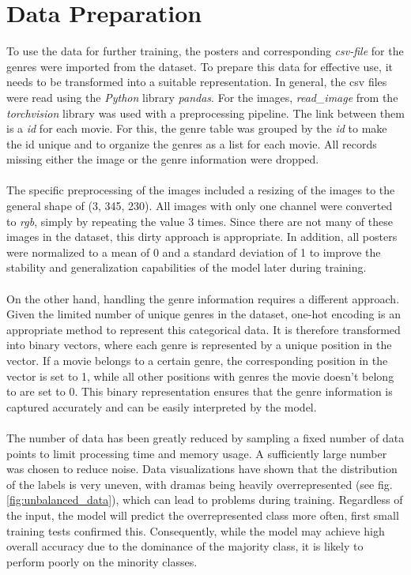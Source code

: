 \documentclass[a4paper, 11pt]{article}
\begin{document}
\section{Data Preparation}
    To use the data for further training, the posters and corresponding \textit{csv-file} for the genres were imported from the dataset. To prepare this data for effective use, it needs to be transformed into a suitable representation. In general, the csv files were read using the \textit{Python} library \textit{pandas}. For the images, \textit{read\_image} from the \textit{torchvision} library was used with a preprocessing pipeline. The link between them is a \textit{id} for each movie. For this, the genre table was grouped by the \textit{id} to make the id unique and to organize the genres as a list for each movie. All records missing either the image or the genre information were dropped.\\\\
    The specific preprocessing of the images included a resizing of the images to the general shape of (3, 345, 230). All images with only one channel were converted to \textit{rgb}, simply by repeating the value 3 times. Since there are not many of these images in the dataset, this dirty approach is appropriate. In addition, all posters were normalized to a mean of 0 and a standard deviation of 1 to improve the stability and generalization capabilities of the model later during training.\\\\
    On the other hand, handling the genre information requires a different approach. Given the limited number of unique genres in the dataset, one-hot encoding is an appropriate method to represent this categorical data. It is therefore transformed into binary vectors, where each genre is represented by a unique position in the vector. If a movie belongs to a certain genre, the corresponding position in the vector is set to 1, while all other positions with genres the movie doesn't belong to are set to 0. This binary representation ensures that the genre information is captured accurately and can be easily interpreted by the model.\\\\
    The number of data has been greatly reduced by sampling a fixed number of data points to limit processing time and memory usage. A sufficiently large number was chosen to reduce noise. 
    Data visualizations have shown that the distribution of the labels is very uneven, with dramas being heavily overrepresented (see fig. \ref{fig:unbalanced_data}), which can lead to problems during training. Regardless of the input, the model will predict the overrepresented class more often, first small training tests confirmed this. Consequently, while the model may achieve high overall accuracy due to the dominance of the majority class, it is likely to perform poorly on the minority classes.
\end{document}

